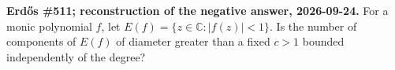 \textbf{Erd\H{o}s \#511; reconstruction of the negative answer, 2026-09-24.}
For a monic polynomial $f$, let $E(f)=\{z\in\mathbb C:|f(z)|<1\}$. Is the number of components of $E(f)$ of diameter greater than a fixed $c>1$ bounded independently of the degree?
